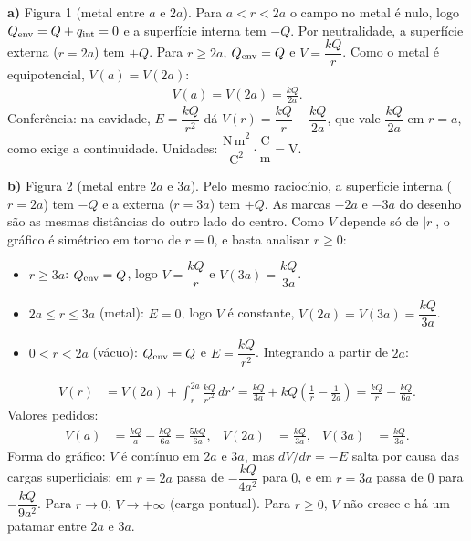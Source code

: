 \documentclass{article}%
\begin{document}
\textbf{a)} Figura 1 (metal entre $a$ e $2a$). Para $a<r<2a$ o campo no metal é nulo, logo $Q_{\rm env}=Q+q_{\rm int}=0$ e a superfície interna tem $-Q$. Por neutralidade, a superfície externa ($r=2a$) tem $+Q$. Para $r\ge 2a$, $Q_{\rm env}=Q$ e $V=\dfrac{kQ}{r}$. Como o metal é equipotencial, $V(a)=V(2a)$:
\begin{align*}
V(a)=V(2a)=\frac{kQ}{2a}.
\end{align*}
Conferência: na cavidade, $E=\dfrac{kQ}{r^2}$ dá $V(r)=\dfrac{kQ}{r}-\dfrac{kQ}{2a}$, que vale $\dfrac{kQ}{2a}$ em $r=a$, como exige a continuidade. Unidades: $\dfrac{\mathrm{N\,m}^2}{\mathrm{C}^2}\cdot\dfrac{\mathrm{C}}{\mathrm{m}}=\mathrm{V}$.

\textbf{b)} Figura 2 (metal entre $2a$ e $3a$). Pelo mesmo raciocínio, a superfície interna ($r=2a$) tem $-Q$ e a externa ($r=3a$) tem $+Q$. As marcas $-2a$ e $-3a$ do desenho são as mesmas distâncias do outro lado do centro. Como $V$ depende só de $|r|$, o gráfico é simétrico em torno de $r=0$, e basta analisar $r\ge 0$:
\begin{itemize}
\item $r\ge 3a$: $Q_{\rm env}=Q$, logo $V=\dfrac{kQ}{r}$ e $V(3a)=\dfrac{kQ}{3a}$.
\item $2a\le r\le 3a$ (metal): $E=0$, logo $V$ é constante, $V(2a)=V(3a)=\dfrac{kQ}{3a}$.
\item $0<r<2a$ (vácuo): $Q_{\rm env}=Q$ e $E=\dfrac{kQ}{r^2}$. Integrando a partir de $2a$:
\end{itemize}
\begin{align*}
V(r)&=V(2a)+\int_r^{2a}\frac{kQ}{r'^2}\,dr'=\frac{kQ}{3a}+kQ\left(\frac1r-\frac1{2a}\right)=\frac{kQ}{r}-\frac{kQ}{6a}.
\end{align*}
Valores pedidos:
\begin{align*}
V(a)&=\frac{kQ}{a}-\frac{kQ}{6a}=\frac{5kQ}{6a}, & V(2a)&=\frac{kQ}{3a}, & V(3a)&=\frac{kQ}{3a}.
\end{align*}
Forma do gráfico: $V$ é contínuo em $2a$ e $3a$, mas $dV/dr=-E$ salta por causa das cargas superficiais: em $r=2a$ passa de $-\dfrac{kQ}{4a^2}$ para $0$, e em $r=3a$ passa de $0$ para $-\dfrac{kQ}{9a^2}$. Para $r\to 0$, $V\to+\infty$ (carga pontual). Para $r\ge 0$, $V$ não cresce e há um patamar entre $2a$ e $3a$.
\end{document}

